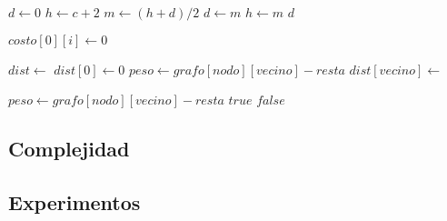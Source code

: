 \begin{algorithm}
\label{resolver}         %
\begin{algorithmic}
	\State {}
    \State $d \gets 0$
	\State $h \gets c + 2$
		\State $m \gets (h + d)/2$
			\State $d \gets m$
		\Else
			\State $h \gets m$
		\EndIf
	\EndWhile
	\Return $d$
\EndFunction
\end{algorithmic}
\end{algorithm}

\begin{algorithm}
\begin{algorithmic}
	\For{$i \in [1..n)$}
		\State {}
		\State $costo[0][i] \gets 0$
	\EndFor
\EndFunction
\end{algorithmic}
\end{algorithm}

\begin{algorithm}
\begin{algorithmic}
	\State $dist \gets$ 
	\State $dist[0] \gets 0$
	\For{$i \in [1..n)$}
				\State $peso \gets grafo[nodo][vecino] - resta$
				\State $dist[vecino] \gets$ 
			\EndFor
		\EndFor
	\EndFor
	\Return {}
\EndFunction
\end{algorithmic}
\end{algorithm}

\begin{algorithm}
\begin{algorithmic}
			\State $peso \gets grafo[nodo][vecino] - resta$
				\Return $true$
			\EndIf
		\EndFor
	\EndFor
	\Return $false$
\EndFunction
\end{algorithmic}
\end{algorithm}

\newpage

\subsection{Complejidad}

\subsection{Experimentos}
